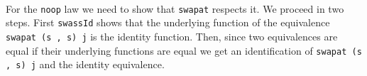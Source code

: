 \begin{code}
\AgdaOperator{\AgdaFunction{]\%=\AgdaUnderscore{}}}\AgdaSymbol{)}\AgdaSpace{}%
\AgdaSpace{}%
\<%
\\
\>[8][@{}l@{\AgdaIndent{0}}]%
\>[10]\AgdaSpace{}%
\AgdaOperator{\AgdaFunction{[}}\AgdaSpace{}%
\AgdaSpace{}%
\AgdaOperator{\AgdaFunction{]\%=}}\AgdaSpace{}%
\<%
\\
%
\>[8]\AgdaSpace{}%
\AgdaSpace{}%
\AgdaSpace{}%
\AgdaSpace{}%
\<%
\\
%
\\[\AgdaEmptyExtraSkip]%
\>[0]\AgdaSpace{}%
\AgdaSymbol{:}\AgdaSpace{}%
\AgdaSymbol{(}\AgdaSpace{}%
\AgdaSpace{}%
\AgdaSymbol{)}\AgdaSpace{}%
\AgdaSpace{}%
\AgdaSpace{}%
\AgdaSpace{}%
\AgdaSpace{}%
\AgdaSpace{}%
\AgdaSpace{}%
\<%
\\
\>[0]\AgdaSpace{}%
\AgdaSymbol{(}\AgdaSpace{}%
\AgdaOperator{\AgdaInductiveConstructor{,}}\AgdaSpace{}%
\AgdaSymbol{)}\AgdaSpace{}%
\AgdaSpace{}%
\AgdaSymbol{=}\AgdaSpace{}%
\<%
\\
\>[0][@{}l@{\AgdaIndent{0}}]%
\>[2]\AgdaSymbol{(}\AgdaSpace{}%
\AgdaSymbol{(}\AgdaSpace{}%
\AgdaSpace{}%
\AgdaSpace{}%
\AgdaSymbol{)}\AgdaSpace{}%
\AgdaSymbol{(}\AgdaSpace{}%
\AgdaSpace{}%
\AgdaSpace{}%
\AgdaSymbol{)}\AgdaSpace{}%
\AgdaSymbol{(}\AgdaSpace{}%
\AgdaSpace{}%
\AgdaSpace{}%
\AgdaSymbol{)}\AgdaSpace{}%
\AgdaSymbol{(}\AgdaSpace{}%
\AgdaSpace{}%
\AgdaSpace{}%
\AgdaSymbol{))}\<%
\end{code}

For the \texttt{noop} law we need to show that \texttt{swapat} respects it.
We proceed in two steps. First \texttt{swassId} shows that the underlying function of the equivalence
\texttt{swapat (s , s) j} is the identity function. Then, since two equivalences are equal if their
underlying functions are equal we get an identification of \texttt{swapat (s , s) j} and the identity equivalence.

